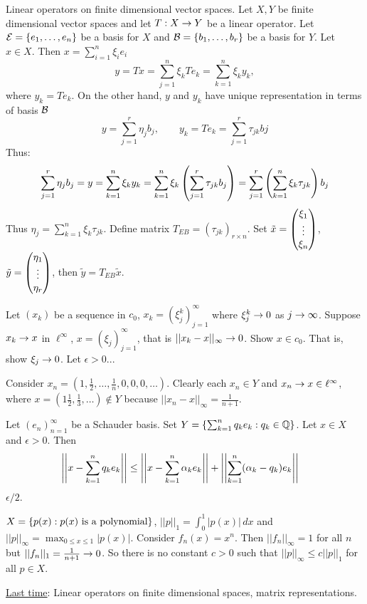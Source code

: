 \documentclass[]{article}
\begin{document}
Linear operators on finite dimensional vector spaces. 
Let $X,Y$ be finite dimensional vector spaces and let $T:X\rightarrow Y$ be a linear operator.
Let $\mathcal{E}=\left\{ e_1,\dots,e_n \right\}$ be a basis for $X$ and $\mathcal{B} = \left\{ b_1,\dots,b_r \right\}$ be a basis for $Y$.
Let $x\in X$. Then $x = \sum_{i=1}^n \xi_ie_i$
$$ y = Tx = \sum_{j=1}^n \xi_k Te_k = \sum_{k=1}^n \xi_ky_k, $$
where $y_k= Te_k$.
On the other hand, $y$ and $y_k$ have unique representation in terms of basis $\mathcal{B}$
$$ y = \sum_{j=1}^r \eta_jb_j, \qquad y_k = Te_k = \sum_{j=1}^r \tau_{jk}bj $$
Thus:
\begin{align*}
	\sum_{j=1}^r \eta_jb_j = y = \sum_{k=1}^n \xi_ky_k 
						= \sum_{k=1}^n \xi_k\left(\sum_{j=1}^r \tau_{jk}b_j\right) 
						= \sum_{j=1}^r \left(\sum_{k=1}^n \xi_k\tau_{jk}\right)b_j
\end{align*}
Thus $\eta_j = \sum_{k=1}^n \xi_k\tau_{jk}$.
Define matrix $T_{EB} = (\tau_{jk})_{r\times n}$.
Set $\tilde x = \begin{pmatrix}\xi_1\\\vdots\\\xi_n\end{pmatrix}$, $\tilde y = \begin{pmatrix}\eta_1\\\vdots\\\eta_r\end{pmatrix}$, then $\tilde y = T_{EB}\tilde x$.

\begin{example}
	[2.3-2] Let $(x_k)$ be a sequence in $c_0$, $x_k=(\xi_j^k)_{j=1}^\infty$ where $\xi_j^k\rightarrow0$ as $j\rightarrow\infty$.
	Suppose $x_k\rightarrow x$ in $\ell^\infty$, $x=(\xi_j)_{j=1}^\infty$, that is $||x_k-x||_\infty\rightarrow0$.
	Show $x\in c_0$. That is, show $\xi_j\rightarrow 0$.
	Let $\epsilon >0$...
\end{example}
\begin{example}
	[2.3-3]
	Consider $x_n = (1,\frac12,\dots,\frac1n,0,0,0,\dots)$.
	Clearly each $x_n\in Y$ and $x_n\rightarrow x\in\ell^\infty$, where $x = (1\frac12,\frac13,\dots)\notin Y$ because $||x_n-x||_\infty = \frac1{n+1}$.
\end{example}
\begin{example}
	[2.3-10] Let $(e_n)_{n=1}^\infty$ be a Schauder basis.
	Set $Y = \left\{ \sum_{k=1}^n q_ke_k : q_k\in\mathbb{Q} \right\}$. Let $x\in X$ and $\epsilon>0$.
	Then 
	\begin{align*}
		\left|\left|x-\sum_{k=1}^nq_ke_k\right|\right| &\leq \left|\left|x-\sum_{k=1}^{n}\alpha_{k}e_{k}\right|\right| + \left|\left|\sum_{k=1}^n(\alpha_k-q_k)e_k\right|\right|
	\end{align*}
	$\epsilon/2$.
\end{example}

\begin{example}
	[Test \#5] $X = \left\{ p(x) : p(x)\text{ is a polynomial} \right\}$, $||p||_1 = \int_0^1 |p(x)|\,dx$ and $||p||_\infty = \max_{0\leq x\leq1}|p(x)|$.
	Consider $f_n(x) = x^n$. Then $||f_n||_\infty=1$ for all $n$ but $||f_n||_1 = \frac1{n+1}\rightarrow0$.
	So there is no constant $c>0$ such that $||p||_\infty\leq c||p||_1$ for all $p\in X$.
\end{example}
\newpage
\ul{Last time}: Linear operators on finite dimensional spaces, matrix representations.
\end{document}
